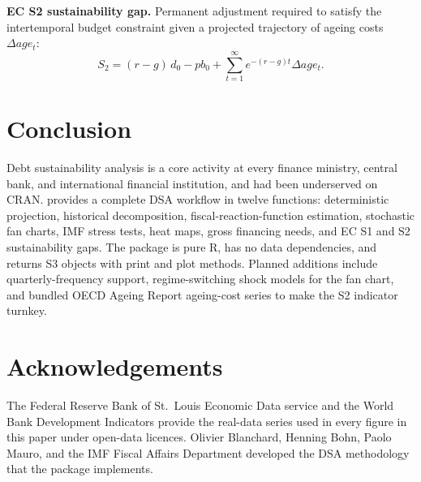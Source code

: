 \textbf{EC S2 sustainability gap.} Permanent adjustment required to
satisfy the intertemporal budget constraint given a projected
trajectory of ageing costs \(\Delta age_t\):
\[S_2 = (r - g)\, d_0 - pb_0 + \sum_{t=1}^{\infty} e^{-(r-g)t} \Delta age_t.\]

\section{Conclusion}\label{conclusion}

Debt sustainability analysis is a core activity at every finance
ministry, central bank, and international financial institution,
and had been underserved on CRAN.  provides a
complete DSA workflow in twelve functions: deterministic
projection, historical decomposition, fiscal-reaction-function
estimation, stochastic fan charts, IMF stress tests, heat maps,
gross financing needs, and EC S1 and S2 sustainability gaps. The
package is pure R, has no data dependencies, and returns S3
objects with print and plot methods. Planned additions include
quarterly-frequency support, regime-switching shock models for the
fan chart, and bundled OECD Ageing Report ageing-cost series to
make the S2 indicator turnkey.

\section*{Acknowledgements}\label{acknowledgements}

The Federal Reserve Bank of St.~Louis Economic Data service and
the World Bank Development Indicators provide the real-data series
used in every figure in this paper under open-data licences.
Olivier Blanchard, Henning Bohn, Paolo Mauro, and the IMF Fiscal
Affairs Department developed the DSA methodology that the package
implements.



\address{%
Charles Coverdale\\
Independent\\%
London, United Kingdom\\
%
\url{https://github.com/charlescoverdale/debtkit}\\%
%
\href{mailto:charles.f.coverdale@gmail.com}{\nolinkurl{charles.f.coverdale@gmail.com}}%
}
